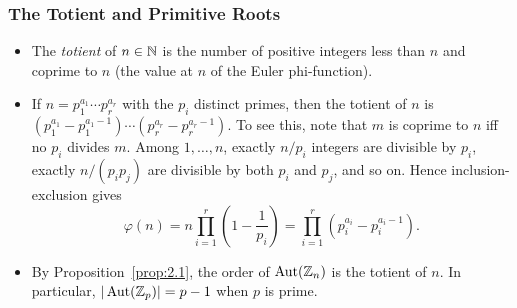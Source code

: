 \documentclass[../Odyssey_Project.tex]{subfiles}
\begin{document}
\subsubsection*{The Totient and Primitive Roots}
\begin{itemize}
    \item The \emph{totient} of $n \in \mathbb{N}$ is the number of positive integers less than $n$ and coprime to $n$ (the value at $n$ of the Euler phi-function).
    \item If $n = p_1^{a_1} \cdots p_r^{a_r}$ with the $p_i$ distinct primes, then the totient of $n$ is $(p_1^{a_1} - p_1^{a_1 - 1}) \cdots (p_r^{a_r} - p_r^{a_r - 1})$. To see this, note that $m$ is coprime to $n$ iff no $p_i$ divides $m$. Among $1,\dots,n$, exactly $n/p_i$ integers are divisible by $p_i$, exactly $n/(p_i p_j)$ are divisible by both $p_i$ and $p_j$, and so on. Hence inclusion-exclusion gives
    \[
        \varphi(n)
        = n \prod_{i = 1}^r \left(1 - \frac{1}{p_i}\right)
        = \prod_{i = 1}^r \left(p_i^{a_i} - p_i^{a_i - 1}\right).
    \]
    \item By Proposition~\ref{prop:2.1}, the order of $\operatorname{Aut}(\mathbb{Z}_n)$ is the totient of $n$. In particular, $|\operatorname{Aut}(\mathbb{Z}_p)| = p - 1$ when $p$ is prime.
\end{itemize}
\end{document}
